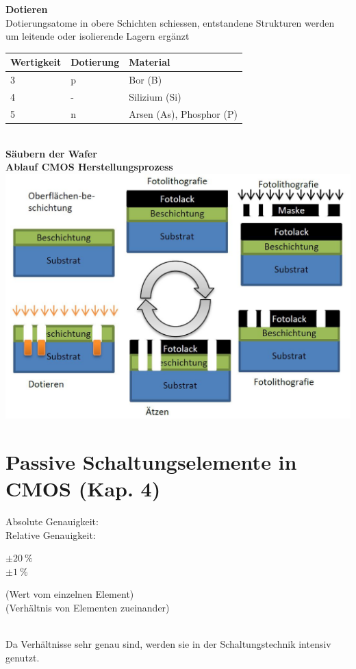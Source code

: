 \begin{minipage}[t]{0.5\textwidth}
	\textbf{Dotieren}\\
	Dotierungsatome in obere Schichten schiessen, entstandene Strukturen werden um leitende oder isolierende Lagern ergänzt \\
	\begin{tabular}{|l|l|l|}
		\hline
		\textbf{Wertigkeit}&\textbf{Dotierung}&\textbf{Material}\\ \hline
		3&p&Bor (B)\\ \hline
		4&-&Silizium (Si)\\ \hline
		5&n&Arsen (As), Phosphor (P)\\ \hline
	\end{tabular} \\
	\textbf{Säubern der Wafer}\\
	\textbf{Ablauf CMOS Herstellungsprozess}\\
	\includegraphics[width=1\textwidth, right]{chapters/Technologie/images/Verarbeitung}

\end{minipage}

\section{Passive Schaltungselemente in CMOS (Kap. 4)}

\begin{minipage}[c]{0.22\textwidth}
	Absolute Genauigkeit:\\Relative Genauigkeit:
\end{minipage}
\begin{minipage}[c]{0.06\textwidth}
	$\pm \SI{20}{\percent}$\\ $\pm \SI{1}{\percent}$
\end{minipage}
\begin{minipage}[c]{0.5\textwidth}
	(Wert vom einzelnen Element)\\(Verhältnis von Elementen zueinander)
\end{minipage}\\[1ex]
Da Verhältnisse sehr genau sind, werden sie in der Schaltungstechnik intensiv genutzt.


